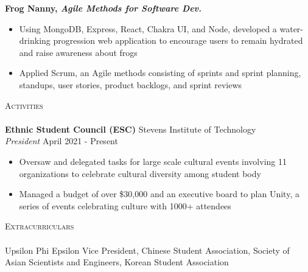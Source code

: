 \documentclass[10pt]{article}
\newcommand{\lineunder} {
    \vspace*{-8pt} \\
    \hspace*{-18pt} \hrulefill \\
}
\newcommand{\header} [1] {
    {\hspace*{-18pt}\vspace*{6pt} \textsc{#1}}
    \vspace*{-6pt} \lineunder
}
\begin{document}
\textbf{Frog Nanny, \textit{Agile Methods for Software Dev.}} 
\begin{itemize}[noitemsep, topsep=0.5pt, parsep=0pt,partopsep=0pt]
    \item Using MongoDB, Express, React, Chakra UI, and Node, developed a water-drinking progression web application to encourage users to remain hydrated and raise awareness about frogs
    \item Applied Scrum, an Agile methods consisting of sprints and sprint planning, standups, user stories, product backlogs, and sprint reviews
\end{itemize}
\vspace{2mm}
\header{Activities}
\textbf{Ethnic Student Council (ESC)} \hfill Stevens Institute of Technology\\
\textit{President} \hfill April 2021 - Present\\
\vspace{-1mm}
\begin{itemize}[noitemsep,parsep=0pt,partopsep=0pt]
    \item Oversaw and delegated tasks for large scale cultural events involving 11 organizations to celebrate cultural diversity among student body
    \item Managed a budget of over \$30,000 and an executive board to plan Unity, a series of events celebrating culture with 1000+ attendees 
\end{itemize}
\vspace{2mm}
\header{Extracurriculars}
Upsilon Phi Epsilon Vice President, Chinese Student Association, Society of Asian Scientists and Engineers, Korean Student Association
\end{document}
